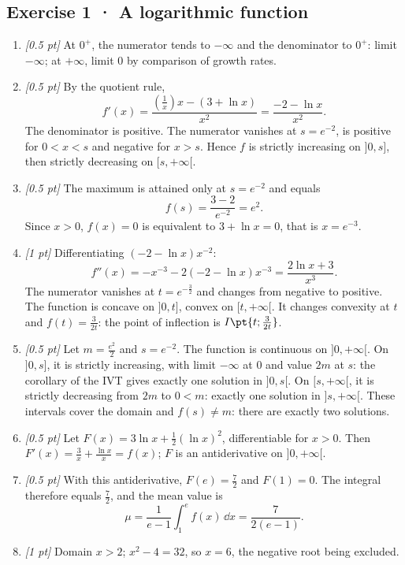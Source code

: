 \subsection*{Exercise 1 · A logarithmic function}\begin{enumerate}

\item \textit{[0.5 pt]} At $0^+$, the numerator tends to $-\infty$ and the denominator to $0^+$: limit $-\infty$; at $+\infty$, limit $0$ by comparison of growth rates.

\item \textit{[0.5 pt]} By the quotient rule,
\[f'(x)=\frac{(\frac{1}{x})x-(3+\ln x)}{x^2}=\frac{-2-\ln x}{x^2}.\]
The denominator is positive. The numerator vanishes at $s=e^{-2}$, is positive for $0<x<s$ and negative for $x>s$. Hence $f$ is strictly increasing on $]0,s]$, then strictly decreasing on $[s,+\infty[$.

\item \textit{[0.5 pt]} The maximum is attained only at $s=e^{-2}$ and equals
\[f(s)=\frac{3- 2}{e^{-2}}=e^{2}.\]
Since $x>0$, $f(x)=0$ is equivalent to $3+\ln x=0$, that is $x=e^{-3}$.

\item \textit{[1 pt]} Differentiating $(-2-\ln x)x^{-2}$:
\[f''(x)=-x^{-3}-2(-2-\ln x)x^{-3}=\frac{2\ln x+3}{x^3}.\]
The numerator vanishes at $t=e^{-\frac{3}{2}}$ and changes from negative to positive. The function is concave on $]0,t]$, convex on $[t,+\infty[$. It changes convexity at $t$ and $f(t)=\frac{3}{2t}$: the point of inflection is $I\pt{t;\frac{3}{2t}}$.

\item \textit{[0.5 pt]} Let $m=\frac{e^{2}}{2}$ and $s=e^{-2}$. The function is continuous on $]0,+\infty[$. On $]0,s]$, it is strictly increasing, with limit $-\infty$ at $0$ and value $2m$ at $s$: the corollary of the IVT gives exactly one solution in $]0,s[$. On $[s,+\infty[$, it is strictly decreasing from $2m$ to $0<m$: exactly one solution in $]s,+\infty[$. These intervals cover the domain and $f(s)\ne m$: there are exactly two solutions.

\item \textit{[0.5 pt]} Let $F(x)=3\ln x+\frac12(\ln x)^2$, differentiable for $x>0$. Then $F'(x)=\frac{3}{x}+\frac{\ln x}{x}=f(x)$; $F$ is an antiderivative on $]0,+\infty[$.

\item \textit{[0.5 pt]} With this antiderivative, $F(e)=\frac{7}{2}$ and $F(1)=0$. The integral therefore equals $\frac{7}{2}$, and the mean value is
\[\mu=\frac{1}{e-1}\int_1^e f(x)\,\dd x=\frac{7}{2(e-1)}.\]

\item \textit{[1 pt]} Domain $x>2$; $x^2-4=32$, so $x=6$, the negative root being excluded.

\end{enumerate}

